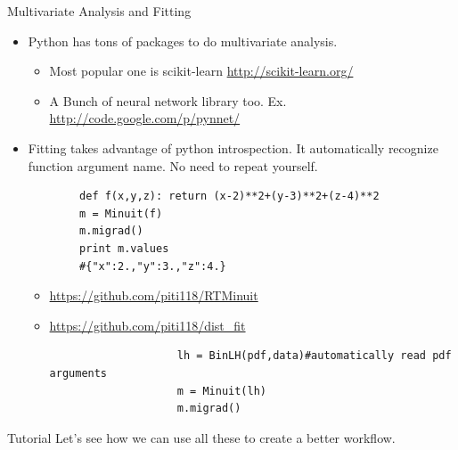 \documentclass{beamer}
\begin{document}
\begin{frame}[fragile]{Multivariate Analysis and Fitting}
	\begin{itemize}
	\item Python has tons of packages to do multivariate analysis.
		\begin{itemize}
			\item Most popular one is scikit-learn
				\url{http://scikit-learn.org/}
			\item A Bunch of neural network library too. Ex.
				\url{http://code.google.com/p/pynnet/}
		\end{itemize}
	\item Fitting takes advantage of python introspection. It
	automatically recognize function argument name. No need to repeat
	yourself.
	\begin{verbatim}
		def f(x,y,z): return (x-2)**2+(y-3)**2+(z-4)**2
		m = Minuit(f)
		m.migrad()
		print m.values
		#{"x":2.,"y":3.,"z":4.}
	\end{verbatim}
		\begin{itemize}
			\item \url{https://github.com/piti118/RTMinuit}
			\item \url{https://github.com/piti118/dist_fit}
				\begin{verbatim}
					lh = BinLH(pdf,data)#automatically read pdf arguments
					m = Minuit(lh)
					m.migrad()
				\end{verbatim}
		\end{itemize}
	\end{itemize}
\end{frame}


\begin{frame}[fragile]{Tutorial}
	Let's see how we can use all these to create a better workflow.
\end{frame}
\end{document}
